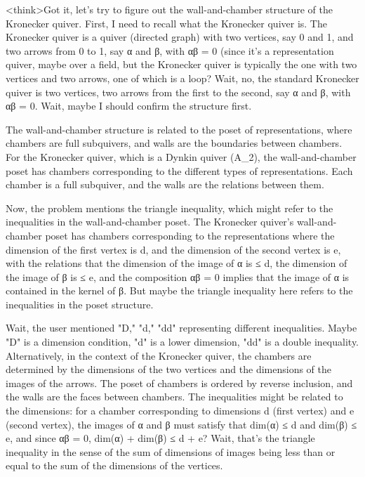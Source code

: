 <think>Got it, let's try to figure out the wall-and-chamber structure of the Kronecker quiver. First, I need to recall what the Kronecker quiver is. The Kronecker quiver is a quiver (directed graph) with two vertices, say 0 and 1, and two arrows from 0 to 1, say α and β, with αβ = 0 (since it's a representation quiver, maybe over a field, but the Kronecker quiver is typically the one with two vertices and two arrows, one of which is a loop? Wait, no, the standard Kronecker quiver is two vertices, two arrows from the first to the second, say α and β, with αβ = 0. Wait, maybe I should confirm the structure first.

The wall-and-chamber structure is related to the poset of representations, where chambers are full subquivers, and walls are the boundaries between chambers. For the Kronecker quiver, which is a Dynkin quiver (A_2), the wall-and-chamber poset has chambers corresponding to the different types of representations. Each chamber is a full subquiver, and the walls are the relations between them.

Now, the problem mentions the triangle inequality, which might refer to the inequalities in the wall-and-chamber poset. The Kronecker quiver's wall-and-chamber poset has chambers corresponding to the representations where the dimension of the first vertex is d, and the dimension of the second vertex is e, with the relations that the dimension of the image of α is ≤ d, the dimension of the image of β is ≤ e, and the composition αβ = 0 implies that the image of α is contained in the kernel of β. But maybe the triangle inequality here refers to the inequalities in the poset structure.

Wait, the user mentioned "D," "d," "dd" representing different inequalities. Maybe "D" is a dimension condition, "d" is a lower dimension, "dd" is a double inequality. Alternatively, in the context of the Kronecker quiver, the chambers are determined by the dimensions of the two vertices and the dimensions of the images of the arrows. The poset of chambers is ordered by reverse inclusion, and the walls are the faces between chambers. The inequalities might be related to the dimensions: for a chamber corresponding to dimensions d (first vertex) and e (second vertex), the images of α and β must satisfy that dim(α) ≤ d and dim(β) ≤ e, and since αβ = 0, dim(α) + dim(β) ≤ d + e? Wait, that's the triangle inequality in the sense of the sum of dimensions of images being less than or equal to the sum of the dimensions of the vertices.

